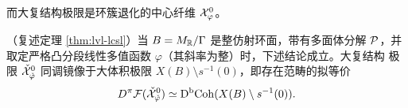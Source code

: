 而大复结构极限是环簇退化的中心纤维 $\mathcal{X}^0_\varphi$。

\begin{thmstar}
（复述定理 \ref{thm:lvl-lcsl}）\quad 当 $B=M_{\mathbb{R}}/\Gamma$ 是整仿射环面，带有多面体分解
$\mathcal{P}$，并取定严格凸分段线性多值函数 $\varphi$（其斜率为整）时，下述结论成立。大复结构
极限 $\check{\mathcal{X}}^0_{\check\varphi}$ 同调镜像于大体积极限
$X(B)\setminus s^{-1}(0)$，即存在范畴的拟等价
\[
D^\pi\mathcal{F}(\check{\mathcal{X}}^0_{\check\varphi})\simeq\mathrm{D}^{\mathrm{b}}\mathrm{Coh}(X(B)\setminus s^{-1}(0)).
\]
\end{thmstar}


